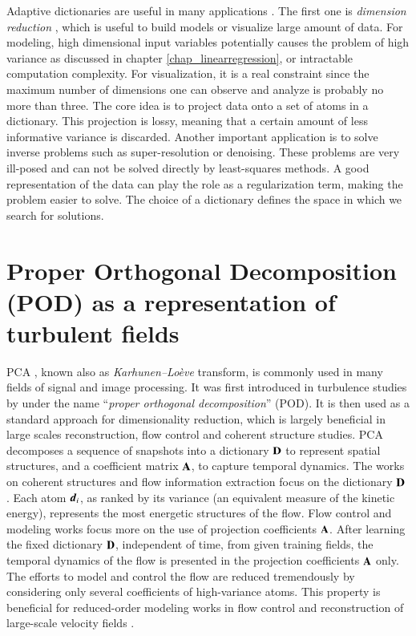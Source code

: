 Adaptive dictionaries are useful in many applications \citep{tovsic2011dictionary}. The first one is \textit{dimension reduction} \citep{burges2010dimension}, which is useful to build models or visualize large amount of data. For modeling, high dimensional input variables potentially causes the problem of high variance as discussed in chapter \ref{chap_linearregression}, or intractable computation complexity. For visualization, it is a real constraint since the maximum number of dimensions one can observe and analyze is probably no more than three. The core idea is to project data onto a set of atoms in a dictionary. This projection is lossy, meaning that a certain amount of less informative variance is discarded. Another important application is to solve inverse problems such as super-resolution or denoising. These problems are very ill-posed and can not be solved directly by least-squares methods. A good representation of the data can play the role as a regularization term, making the problem easier to solve. The choice of a dictionary defines the space in which we search for solutions.

\section{Proper Orthogonal Decomposition (POD) as a representation of turbulent fields}
PCA \citep{jolliffe2002principal}, known also as \textit{Karhunen–Loève} transform, is commonly used in many fields of signal and image processing. It was first introduced in turbulence studies by \citet{lumley1967} under the name ``\textit{proper orthogonal decomposition}'' (POD). It is then used as a standard approach for dimensionality reduction, which is largely beneficial in large scales reconstruction, flow control and coherent structure studies. PCA decomposes a sequence of snapshots into a dictionary $ \mathbf{D} $ to represent spatial structures, and a coefficient matrix $ \mathbf{A} $, to capture temporal dynamics. The works on coherent structures and flow information extraction focus on the dictionary $ \mathbf{D} $ \citep{bonnet1994stochastic, gordeyev2000coherent}. Each atom $ \boldsymbol{d}_i $, as ranked by its variance (an equivalent measure of the kinetic energy), represents the most energetic structures of the flow. Flow control and modeling works focus more on the use of projection coefficients $ \mathbf{A} $. After learning the fixed dictionary $ \mathbf{D} $, independent of time, from given training fields, the temporal dynamics of the flow is presented in the projection coefficients $ \mathbf{A} $ only. The efforts to model and control the flow are reduced tremendously by considering only several coefficients of high-variance atoms. This property is beneficial for reduced-order modeling works in flow control and reconstruction of large-scale velocity fields \citep{ravindran2000reduced, ly2001modeling, taylor2004towards}.

